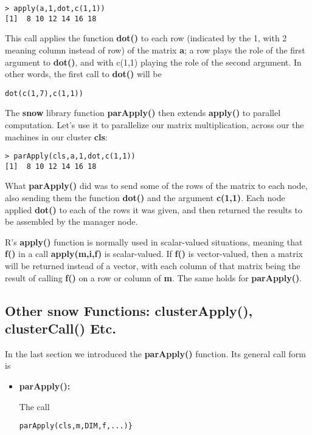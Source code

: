 \begin{lstlisting}
> apply(a,1,dot,c(1,1))
[1]  8 10 12 14 16 18
\end{lstlisting}

This call applies the function {\bf dot()} to each row (indicated by the
1, with 2 meaning column instead of row) of the matrix {\bf a}; a row
plays the role of the first argument to {\bf dot()}, and with c(1,1)
playing the role of the second argument.  In other words, the first call
to {\bf dot()} will be

\begin{lstlisting}
dot(c(1,7),c(1,1))
\end{lstlisting}

The {\bf snow} library function {\bf parApply()} then extends {\bf
apply()} to parallel computation.  Let's use it to parallelize our
matrix multiplication, across our the machines in our cluster {\bf cls}:

\begin{lstlisting}
> parApply(cls,a,1,dot,c(1,1))
[1]  8 10 12 14 16 18
\end{lstlisting}

What {\bf parApply()} did was to send some of the rows of the matrix to
each node, also sending them the function {\bf dot()} and the argument
{\bf c(1,1)}.  Each node applied {\bf dot()} to each of the rows it was
given, and then returned the results to be assembled by the manager node.

R's {\bf apply()} function is normally used in scalar-valued situations,
meaning that {\bf f()} in a call {\bf apply(m,i,f)} is scalar-valued.
If {\bf f()} is vector-valued, then a matrix will be returned instead of
a vector, with each column of that matrix being the result of calling
{\bf f()} on a row or column of {\bf m}.  The same holds for {\bf
parApply()}.

\subsection{Other snow Functions:  clusterApply(), clusterCall() Etc.}

In the last section we introduced the {\bf parApply()} function.  Its
general call form is

\begin{itemize}

\item {\bf parApply():}

The call 

\begin{lstlisting}
parApply(cls,m,DIM,f,...)}
\end{lstlisting}

\end{itemize}

